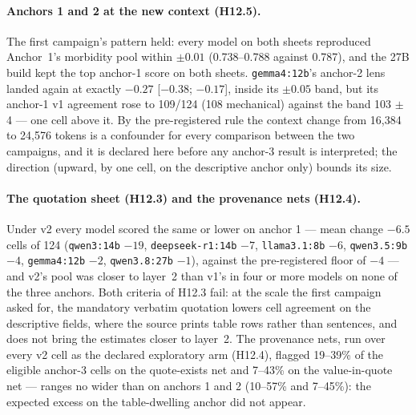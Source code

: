 \documentclass[11pt]{article}
\begin{document}
\paragraph{Anchors 1 and 2 at the new context (H12.5).} The first campaign's pattern held: every model on both sheets reproduced Anchor~1's morbidity pool within $\pm0.01$ (0.738--0.788 against 0.787), and the 27B build kept the top anchor-1 score on both sheets. \texttt{gemma4:12b}'s anchor-2 lens landed again at exactly $-0.27$ [$-0.38$; $-0.17$], inside its $\pm0.05$ band, but its anchor-1 v1 agreement rose to 109/124 (108 mechanical) against the band 103 $\pm$ 4 --- one cell above it. By the pre-registered rule the context change from 16{,}384 to 24{,}576 tokens is a confounder for every comparison between the two campaigns, and it is declared here before any anchor-3 result is interpreted; the direction (upward, by one cell, on the descriptive anchor only) bounds its size.

\paragraph{The quotation sheet (H12.3) and the provenance nets (H12.4).} Under v2 every model scored the same or lower on anchor 1 --- mean change $-6.5$ cells of 124 (\texttt{qwen3:14b} $-19$, \texttt{deepseek-r1:14b} $-7$, \texttt{llama3.1:8b} $-6$, \texttt{qwen3.5:9b} $-4$, \texttt{gemma4:12b} $-2$, \texttt{qwen3.8:27b} $-1$), against the pre-registered floor of $-4$ --- and v2's pool was closer to layer~2 than v1's in four or more models on none of the three anchors. Both criteria of H12.3 fail: at the scale the first campaign asked for, the mandatory verbatim quotation lowers cell agreement on the descriptive fields, where the source prints table rows rather than sentences, and does not bring the estimates closer to layer~2. The provenance nets, run over every v2 cell as the declared exploratory arm (H12.4), flagged 19--39\% of the eligible anchor-3 cells on the quote-exists net and 7--43\% on the value-in-quote net --- ranges no wider than on anchors 1 and 2 (10--57\% and 7--45\%): the expected excess on the table-dwelling anchor did not appear.
\end{document}
